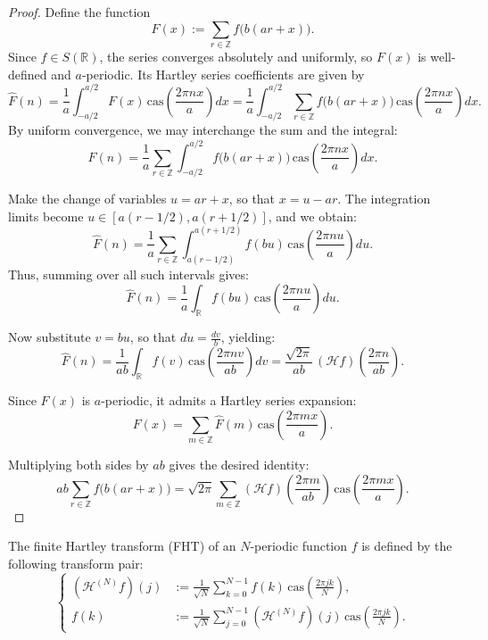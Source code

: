 \documentclass[12 pt]{amsart}
\numberwithin{equation}{section}
\begin{document}
\begin{proof}
Define the function
\[
F(x) := \sum_{r \in \mathbb{Z}} f\big(b(ar + x)\big).
\]
Since \( f \in S(\mathbb{R}) \), the series converges absolutely and uniformly, so \( F(x) \) is well-defined and \( a \)-periodic. Its Hartley series coefficients are given by
\[
\widehat{F}(n) = \frac{1}{a} \int_{-a/2}^{a/2} F(x) \, \mathrm{cas}\left( \frac{2\pi n x}{a} \right) dx
= \frac{1}{a} \int_{-a/2}^{a/2} \sum_{r \in \mathbb{Z}} f\big(b(ar + x)\big) \, \mathrm{cas}\left( \frac{2\pi n x}{a} \right) dx.
\]
By uniform convergence, we may interchange the sum and the integral:
\[
\widehat{F}(n) = \frac{1}{a} \sum_{r \in \mathbb{Z}} \int_{-a/2}^{a/2} f\big(b(ar + x)\big) \, \mathrm{cas}\left( \frac{2\pi n x}{a} \right) dx.
\]

Make the change of variables \( u = ar + x \), so that \( x = u - ar \). The integration limits become \( u \in [a(r - 1/2), a(r + 1/2)] \), and we obtain:
\[
\widehat{F}(n) = \frac{1}{a} \sum_{r \in \mathbb{Z}} \int_{a(r - 1/2)}^{a(r + 1/2)} f(bu) \, \mathrm{cas}\left( \frac{2\pi n u}{a} \right) du.
\]
Thus, summing over all such intervals gives:
\[
\widehat{F}(n) = \frac{1}{a} \int_{\mathbb{R}} f(bu) \, \mathrm{cas}\left( \frac{2\pi n u}{a} \right) du.
\]

Now substitute \( v = bu \), so that \( du = \frac{dv}{b} \), yielding:
\[
\widehat{F}(n) = \frac{1}{ab} \int_{\mathbb{R}} f(v) \, \mathrm{cas}\left( \frac{2\pi n v}{ab} \right) dv
= \frac{\sqrt{2\pi}}{ab} \, (\mathscr{H}f)\left( \frac{2\pi n}{ab} \right).
\]

Since \( F(x) \) is \( a \)-periodic, it admits a Hartley series expansion:
\[
F(x) = \sum_{m \in \mathbb{Z}} \widehat{F}(m) \, \mathrm{cas}\left( \frac{2\pi m x}{a} \right).
\]

Multiplying both sides by \( ab \) gives the desired identity:
\[
ab \sum_{r \in \mathbb{Z}} f\big(b(ar + x)\big)
= \sqrt{2\pi} \sum_{m \in \mathbb{Z}} (\mathscr{H}f)\left( \frac{2\pi m}{ab} \right) \, \mathrm{cas}\left( \frac{2\pi m x}{a} \right).
\]
\end{proof}
The finite Hartley transform (FHT) of an \( N \)-periodic function \( f \) is defined by the following transform pair:
\begin{equation}\label{HartleyTr}
\left\{
  \begin{aligned}
     (\mathcal{H}^{(N)}f)(j) &:= \frac{1}{\sqrt{N}} \sum_{k=0}^{N-1} f(k)\,
     \mathrm{cas}\left( \frac{2\pi j k}{N} \right), \\[10pt]
     f(k) &:= \frac{1}{\sqrt{N}} \sum_{j=0}^{N-1} (\mathcal{H}^{(N)}f)(j)\,
     \mathrm{cas}\left( \frac{2\pi j k}{N} \right).
  \end{aligned}
\right.
\end{equation}
\end{document}
